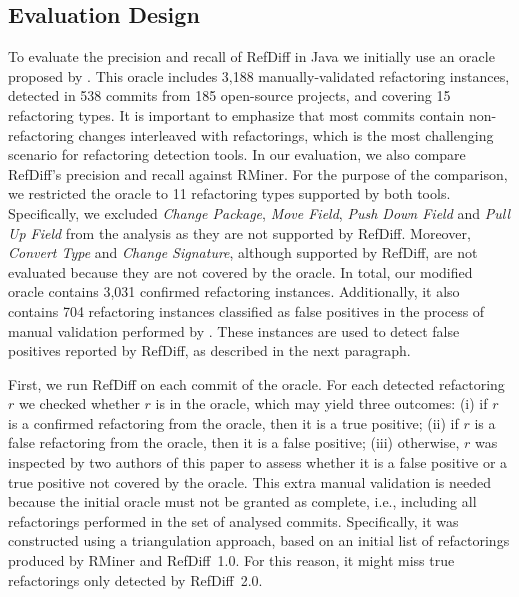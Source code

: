 \subsection{Evaluation Design}
\label{sec:eval:java:design}

To evaluate the precision and recall of RefDiff in Java we initially use an oracle proposed by \cite{tsantalis2018rminer}.
This oracle includes 3,188 manually-validated refactoring instances, detected in 538 commits from 185 open-source projects, and covering 15 refactoring types.
It is important to emphasize that most commits contain non-refactoring changes interleaved with refactorings, which is the most challenging scenario for refactoring detection tools.
In our evaluation, we also compare RefDiff's precision and recall against RMiner.
For the purpose of the comparison, we restricted the oracle to 11 refactoring types supported by both tools.
Specifically, we excluded \emph{Change Package}, \emph{Move Field}, \emph{Push Down Field} and \emph{Pull Up Field} from the analysis as they are not supported by RefDiff.
Moreover, \emph{Convert Type} and \emph{Change Signature}, although supported by RefDiff, are not evaluated because they are not covered by the oracle.
In total, our modified oracle contains 3,031 confirmed refactoring instances.
Additionally, it also contains 704 refactoring instances classified as false positives in the process of manual validation performed by \cite{tsantalis2018rminer}.
These instances are used to detect false positives reported by RefDiff, as described in the next paragraph.

First, we run RefDiff on each commit of the oracle. For each detected refactoring $r$ we checked whether $r$ is in the oracle, which may yield three outcomes: (i) if $r$ is a confirmed refactoring from the oracle, then it is a true positive; (ii) if $r$ is a false refactoring from the oracle, then it is a false positive; (iii) otherwise, $r$ was inspected by two authors of this paper to assess whether it is a false positive or a true positive not covered by the oracle.
This extra manual validation is needed because the initial oracle must not be granted as complete, i.e., including all refactorings performed in the set of analysed commits.
Specifically, it was constructed using a triangulation approach, based on an initial list of refactorings produced by RMiner and RefDiff~1.0. For this reason, it might miss true refactorings only detected by RefDiff~2.0. %

